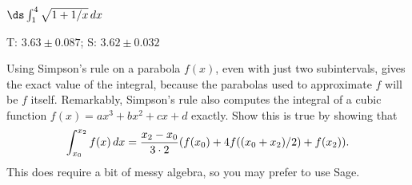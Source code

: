 \begin{exercises}
\exercise $\ds\int_1^4 \sqrt{1+1/x}\,dx$
\begin{answer} T: $3.63\pm 0.087$; S: $3.62\pm 0.032$
\end{answer}

\endtwocol

\msk
\exercise Using Simpson's rule on a parabola $f(x)$, even with just
two subintervals, gives the exact value of the integral, because the
parabolas used to approximate $f$ will be $f$ itself. Remarkably,
Simpson's rule also computes the integral of a cubic function
$f(x)=ax^3+bx^2+cx+d$ exactly. Show this is true by showing that
$$
  \int_{x_0}^{x_2}
  f(x)\,dx={x_2-x_0\over3\cdot2}(f(x_0)+4f((x_0+x_2)/2)+f(x_2)).
$$
This does require a bit of messy algebra, so you may prefer to use Sage.

\end{exercises}
